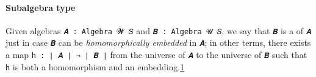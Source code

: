 \paragraph{Subalgebra type}\label{subalgebra-type}

Given algebras \texttt{𝑨\ :\ Algebra\ 𝓦\ 𝑆} and
\texttt{𝑩\ :\ Algebra\ 𝓤\ 𝑆}, we say that \texttt{𝑩} is a
 of \texttt{𝑨} just in case \texttt{𝑩} can be
\emph{homomorphically embedded} in \texttt{𝑨}; in other terms, there
exists a map \texttt{h\ :\ ∣\ 𝑨\ ∣\ →\ ∣\ 𝑩\ ∣} from the universe of
\texttt{𝑨} to the universe of \texttt{𝑩} such that \texttt{h} is both a
homomorphism and an
embedding.\href{Subalgebras.Subalgebras.html\#fn1}{1}
\ccpad
\begin{code}%
\>[0]\AgdaSpace{}%
\AgdaModule{\AgdaUnderscore{}}\AgdaSpace{}%
\AgdaSymbol{\{}\AgdaSpace{}%
\AgdaSpace{}%
\AgdaSymbol{:}\AgdaSpace{}%
\AgdaSymbol{\}}\AgdaSpace{}%
\<%
\\
%
\\[\AgdaEmptyExtraSkip]%
\>[0][@{}l@{\AgdaIndent{0}}]%
\>[1]\AgdaSpace{}%
\AgdaSymbol{:}\AgdaSpace{}%
\AgdaSymbol{(}\AgdaSpace{}%
\AgdaSymbol{:}\AgdaSpace{}%
\AgdaSpace{}%
\AgdaSpace{}%
\AgdaSymbol{)(}\AgdaSpace{}%
\AgdaSymbol{:}\AgdaSpace{}%
\AgdaSpace{}%
\AgdaSpace{}%
\AgdaSymbol{)}\AgdaSpace{}%
\AgdaSpace{}%
\AgdaSpace{}%
\AgdaSpace{}%
\AgdaSpace{}%
\AgdaSpace{}%
\AgdaSpace{}%
\AgdaSpace{}%
\AgdaSpace{}%
\<%
\\
%
\>[1]\AgdaSpace{}%
\AgdaSpace{}%
\AgdaSpace{}%
\AgdaSymbol{=}\AgdaSpace{}%
\AgdaSpace{}%
\AgdaSpace{}%
\AgdaSpace{}%
\AgdaSpace{}%
\AgdaSpace{}%
\AgdaSpace{}%
\AgdaFunction{,}\AgdaSpace{}%
\AgdaSpace{}%
\AgdaSpace{}%
\AgdaSpace{}%
\<%
\\
%
\\[\AgdaEmptyExtraSkip]%
%
\>[1]\AgdaSpace{}%

\end{code}
